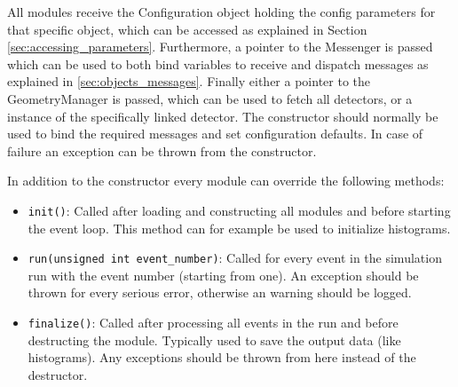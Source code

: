All modules receive the Configuration object holding the config parameters for that specific object, which can be accessed as explained in Section \ref{sec:accessing_parameters}. Furthermore, a pointer to the Messenger is passed which can be used to both bind variables to receive and dispatch messages as explained in \ref{sec:objects_messages}. Finally either a pointer to the GeometryManager is passed, which can be used to fetch all detectors, or a instance of the specifically linked detector. The constructor should normally be used to bind the required messages and set configuration defaults. In case of failure an exception can be thrown from the constructor. 

In addition to the constructor every module can override the following methods:
\begin{itemize}
\item \texttt{init()}: Called after loading and constructing all modules and before starting the event loop. This method can for example be used to initialize histograms.
\item \texttt{run(unsigned int event\_number)}: Called for every event in the simulation run with the event number (starting from one). An exception should be thrown for every serious error, otherwise an warning should be logged.
\item \texttt{finalize()}: Called after processing all events in the run and before destructing the module. Typically used to save the output data (like histograms). Any exceptions should be thrown from here instead of the destructor.
\end{itemize}

